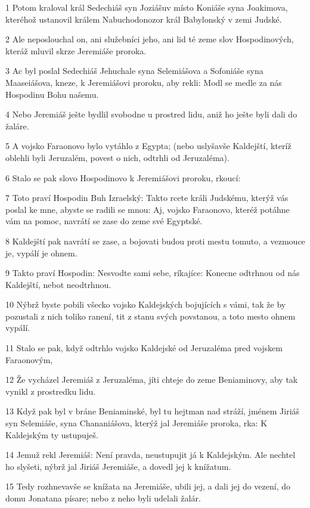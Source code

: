 \par 1 Potom kraloval král Sedechiáš syn Joziášuv místo Koniáše syna Joakimova, kteréhož ustanovil králem Nabuchodonozor král Babylonský v zemi Judské.
\par 2 Ale neposlouchal on, ani služebníci jeho, ani lid té zeme slov Hospodinových, kteráž mluvil skrze Jeremiáše proroka.
\par 3 Ac byl poslal Sedechiáš Jehuchale syna Selemiášova a Sofoniáše syna Maaseiášova, kneze, k Jeremiášovi proroku, aby rekli: Modl se medle za nás Hospodinu Bohu našemu.
\par 4 Nebo Jeremiáš ješte bydlil svobodne u prostred lidu, aniž ho ješte byli dali do žaláre.
\par 5 A vojsko Faraonovo bylo vytáhlo z Egypta; (nebo uslyšavše Kaldejští, kteríž oblehli byli Jeruzalém, povest o nich, odtrhli od Jeruzaléma).
\par 6 Stalo se pak slovo Hospodinovo k Jeremiášovi proroku, rkoucí:
\par 7 Toto praví Hospodin Buh Izraelský: Takto rcete králi Judskému, kterýž vás poslal ke mne, abyste se radili se mnou: Aj, vojsko Faraonovo, kteréž potáhne vám na pomoc, navrátí se zase do zeme své Egyptské.
\par 8 Kaldejští pak navrátí se zase, a bojovati budou proti mestu tomuto, a vezmouce je, vypálí je ohnem.
\par 9 Takto praví Hospodin: Nesvodte sami sebe, ríkajíce: Konecne odtrhnou od nás Kaldejští, nebot neodtrhnou.
\par 10 Nýbrž byste pobili všecko vojsko Kaldejských bojujících s vámi, tak že by pozustali z nich toliko ranení, tit z stanu svých povstanou, a toto mesto ohnem vypálí.
\par 11 Stalo se pak, když odtrhlo vojsko Kaldejské od Jeruzaléma pred vojskem Faraonovým,
\par 12 Že vycházel Jeremiáš z Jeruzaléma, jíti chteje do zeme Beniaminovy, aby tak vynikl z prostredku lidu.
\par 13 Když pak byl v bráne Beniaminské, byl tu hejtman nad stráží, jménem Jiriáš syn Selemiáše, syna Chananiášova, kterýž jal Jeremiáše proroka, rka: K Kaldejským ty ustupuješ.
\par 14 Jemuž rekl Jeremiáš: Není pravda, neustupujit já k Kaldejským. Ale nechtel ho slyšeti, nýbrž jal Jiriáš Jeremiáše, a dovedl jej k knížatum.
\par 15 Tedy rozhnevavše se knížata na Jeremiáše, ubili jej, a dali jej do vezení, do domu Jonatana písare; nebo z neho byli udelali žalár.
